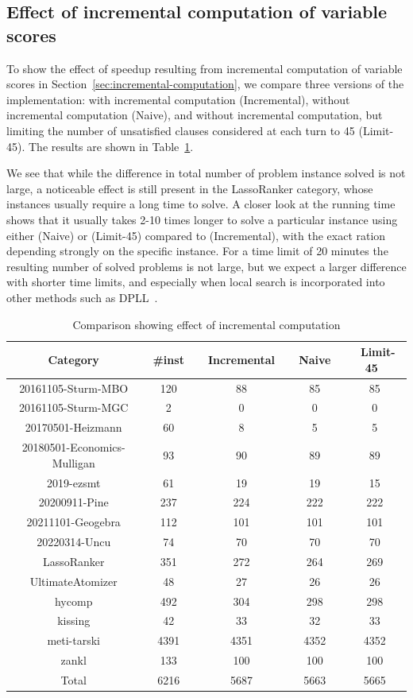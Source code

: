 \documentclass[runningheads]{llncs}
\begin{document}
\subsection{Effect of incremental computation of variable scores}

To show the effect of speedup resulting from incremental computation of variable scores in Section~\ref{sec:incremental-computation}, we compare three versions of the implementation: with incremental computation (Incremental), without incremental computation (Naive), and without incremental computation, but limiting the number of unsatisfied clauses considered at each turn to 45 (Limit-45). The results are shown in Table~\ref{tab:compare-incremental}.

We see that while the difference in total number of problem instance solved is not large, a noticeable effect is still present in the \textsf{LassoRanker} category, whose instances usually require a long time to solve. A closer look at the running time shows that it usually takes 2-10 times longer to solve a particular instance using either (Naive) or (Limit-45) compared to (Incremental), with the exact ration depending strongly on the specific instance. For a time limit of 20 minutes the resulting number of solved problems is not large, but we expect a larger difference with shorter time limits, and especially when local search is incorporated into other methods such as DPLL~\cite{CaiZ21,CaiZFB22}.

\begin{table}[!t]
\small
\centering
\begin{tabular}{c | c | c | c | c }
Category & ~\#inst~ & ~Incremental~ & ~Naive~ & ~Limit-45~ \\ \hline
20161105-Sturm-MBO & 120 & 88 & 85 & 85 \\
20161105-Sturm-MGC & 2 & 0 & 0 & 0 \\
20170501-Heizmann & 60 & 8 & 5 & 5 \\
20180501-Economics-Mulligan & 93 & 90 & 89 & 89 \\
2019-ezsmt & 61 & 19 & 19 & 15 \\
20200911-Pine & 237 & 224 & 222 & 222 \\
20211101-Geogebra & 112 & 101 & 101 & 101 \\
20220314-Uncu & 74 & 70 & 70 & 70 \\
LassoRanker & 351 & 272 & 264 & 269 \\
UltimateAtomizer & 48 & 27 & 26 & 26 \\
hycomp & 492 & 304 & 298 & 298 \\
kissing & 42 & 33 & 32 & 33 \\
meti-tarski & 4391 & 4351 & 4352 & 4352 \\
zankl & 133 & 100 & 100 & 100 \\ \hline
Total & 6216 & 5687 & 5663 & 5665
\end{tabular}
\vspace{2mm}
\caption{Comparison showing effect of incremental computation}
\label{tab:compare-incremental}
\end{table}
\end{document}
